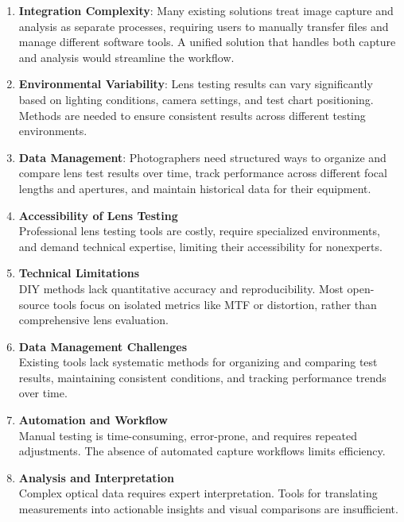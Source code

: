 \begin{enumerate}
    \item \textbf{Integration Complexity}: Many existing solutions treat image capture and analysis as separate processes, requiring users to manually transfer files and manage different software tools. A unified solution that handles both capture and analysis would streamline the workflow.
    
    \item \textbf{Environmental Variability}: Lens testing results can vary significantly based on lighting conditions, camera settings, and test chart positioning. Methods are needed to ensure consistent results across different testing environments.
    
    \item \textbf{Data Management}: Photographers need structured ways to organize and compare lens test results over time, track performance across different focal lengths and apertures, and maintain historical data for their equipment.

    \item \textbf{Accessibility of Lens Testing} \\
        Professional lens testing tools are costly, require specialized environments, and demand technical expertise, limiting their accessibility for nonexperts.
        
    \item \textbf{Technical Limitations} \\
        DIY methods lack quantitative accuracy and reproducibility. Most open-source tools focus on isolated metrics like MTF or distortion, rather than comprehensive lens evaluation.
        
    \item \textbf{Data Management Challenges} \\
        Existing tools lack systematic methods for organizing and comparing test results, maintaining consistent conditions, and tracking performance trends over time.

    \item \textbf{Automation and Workflow} \\
        Manual testing is time-consuming, error-prone, and requires repeated adjustments. The absence of automated capture workflows limits efficiency.

    \item \textbf{Analysis and Interpretation} \\
        Complex optical data requires expert interpretation. Tools for translating measurements into actionable insights and visual comparisons are insufficient.
\end{enumerate}

